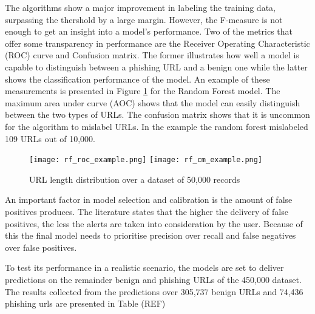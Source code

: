 The algorithms show a major improvement in labeling the training data, surpassing the thershold by a large margin. However, the F-measure is not enough to get an insight into a model's performance. Two of the metrics that offer some transparency in performance are the Receiver Operating Characteristic (ROC) curve and Confusion matrix. The former illustrates how well a model is capable to distinguish between a phishing URL and a benign one while the latter shows the classification performance of the model.
An example of these measurements is presented in Figure \ref{fig:ROC_CM_EXAMPLE} for the Random Forest model. The maximum area under curve (AOC) shows that the model can easily distinguish between the two types of URLs. The confusion matrix shows that it is uncommon for the algorithm to mislabel URLs. In the example the random forest mislabeled 109 URLs out of 10,000.

\begin{figure}[t]
	\centering
	\texttt{[image: rf\_roc\_example.png]}
	\texttt{[image: rf\_cm\_example.png]}
	\caption{URL length distribution over a dataset of 50,000 records}
	\label{fig:ROC_CM_EXAMPLE}
\end{figure}

An important factor in model selection and calibration is the amount of false positives produces. The literature states that the higher the delivery of false positives, the less the alerts are taken into consideration by the user. Because of this the final model needs to prioritise precision over recall and false negatives over false positives.

To test its performance in a realistic scenario, the models are set to deliver predictions on the remainder benign and phishing URLs of the 450,000 dataset. The results collected from the predictions over 305,737 benign URLs and 74,436 phishing urls are presented in Table (REF)


